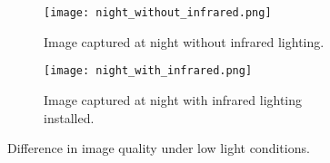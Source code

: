 \begin{figure}
	\begin{subfigure}{0.95\textwidth}
		\texttt{[image: night\_without\_infrared.png]}
		\caption{Image captured at night without infrared lighting.}\label{fig:night_without_infrared}
	\end{subfigure}
    \br
	\begin{subfigure}{0.95\textwidth}
		\texttt{[image: night\_with\_infrared.png]}
		\caption{Image captured at night with infrared lighting installed.}\label{fig:night_with_infrared}
	\end{subfigure}

	\caption{Difference in image quality under low light conditions.}\label{fig:low_light_conditions}
\end{figure}





